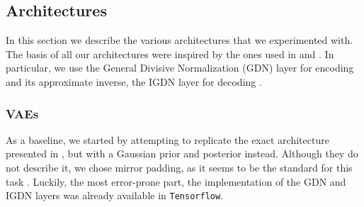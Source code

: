 \documentclass{article}
\begin{document}
\subsection{Architectures}
\label{sec:architectures}
\par
In this section we describe the various architectures that we experimented with.
The basis of all our architectures were inspired by the ones used in
\cite{balle2016end} and \cite{balle2018variational}. In particular, we use the
General Divisive Normalization (GDN) layer for encoding and its approximate
inverse, the IGDN layer for decoding \cite{balle2015density} \cite{balle2016end}.

\subsubsection{VAEs}
\par
As a baseline, we started by attempting to replicate the exact architecture
presented in \cite{balle2016end}, but with a Gaussian prior and posterior
instead. Although they do not describe it, we chose mirror padding, as it seems
to be the standard for this task \cite{theis2017lossy}. Luckily, the most
error-prone part, the implementation of the GDN and IGDN layers was already
available in \texttt{Tensorflow}\footnotemark.

\end{document}
